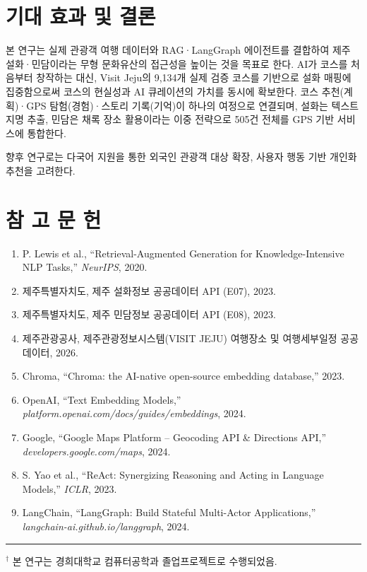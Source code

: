 \documentclass[10pt,twocolumn,a4paper]{article}
\begin{document}
\section{기대 효과 및 결론}

본 연구는 실제 관광객 여행 데이터와 RAG·LangGraph 에이전트를 결합하여
제주 설화·민담이라는 무형 문화유산의 접근성을 높이는 것을 목표로 한다.
AI가 코스를 처음부터 창작하는 대신, Visit Jeju의 9,134개 실제 검증 코스를
기반으로 설화 매핑에 집중함으로써 코스의 현실성과 AI 큐레이션의 가치를
동시에 확보한다. 코스 추천(계획)·GPS 탐험(경험)·스토리 기록(기억)이 하나의
여정으로 연결되며, 설화는 텍스트 지명 추출, 민담은 채록 장소 활용이라는
이중 전략으로 505건 전체를 GPS 기반 서비스에 통합한다.

향후 연구로는 다국어 지원을 통한 외국인 관광객 대상 확장, 사용자 행동 기반
개인화 추천을 고려한다.

\section*{참 고 문 헌}

\begin{small}
\begin{enumerate}
\setlength{\itemsep}{1pt}
\item P. Lewis et al., ``Retrieval-Augmented Generation for
  Knowledge-Intensive NLP Tasks,'' \textit{NeurIPS}, 2020.
\item 제주특별자치도, 제주 설화정보 공공데이터 API (E07), 2023.
\item 제주특별자치도, 제주 민담정보 공공데이터 API (E08), 2023.
\item 제주관광공사, 제주관광정보시스템(VISIT JEJU) 여행장소 및 여행세부일정
  공공데이터, 2026.
\item Chroma, ``Chroma: the AI-native open-source embedding database,''
  2023.
\item OpenAI, ``Text Embedding Models,''
  \textit{platform.openai.com/docs/guides/embeddings}, 2024.
\item Google, ``Google Maps Platform -- Geocoding API \& Directions
  API,'' \textit{developers.google.com/maps}, 2024.
\item S. Yao et al., ``ReAct: Synergizing Reasoning and Acting in
  Language Models,'' \textit{ICLR}, 2023.
\item LangChain, ``LangGraph: Build Stateful Multi-Actor
  Applications,'' \textit{langchain-ai.github.io/langgraph}, 2024.
\end{enumerate}
\end{small}

\vspace{6pt}
\noindent\rule{\columnwidth}{0.4pt}
\vspace{4pt}
{\footnotesize $^\dagger$ 본 연구는 경희대학교 컴퓨터공학과 졸업프로젝트로 수행되었음.}
\end{document}
